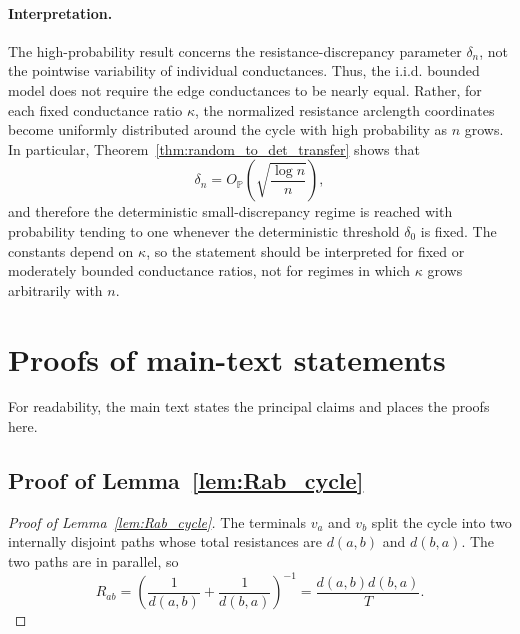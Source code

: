 \documentclass[11pt]{article}
\numberwithin{equation}{section}
\theoremstyle{definition}
\theoremstyle{remark}
\begin{document}
\paragraph{Interpretation.}
The high-probability result concerns the resistance-discrepancy parameter
$\delta_n$, not the pointwise variability of individual conductances. Thus,
the i.i.d. bounded model does not require the edge conductances to be nearly
equal. Rather, for each fixed conductance ratio $\kappa$, the normalized
resistance arclength coordinates become uniformly distributed around the
cycle with high probability as $n$ grows. In particular,
Theorem~\ref{thm:random_to_det_transfer} shows that
\[
\delta_n = O_{\mathbb P}\!\left(\sqrt{\frac{\log n}{n}}\right),
\]
and therefore the deterministic small-discrepancy regime is reached with
probability tending to one whenever the deterministic threshold
$\delta_0$ is fixed. The constants depend on $\kappa$, so the statement
should be interpreted for fixed or moderately bounded conductance ratios,
not for regimes in which $\kappa$ grows arbitrarily with $n$.




\section{Proofs of main-text statements}
\label{app:main-proofs}
For readability, the main text states the principal claims and places the proofs here.

\subsection{Proof of Lemma~\ref{lem:Rab_cycle}}
\begin{proof}[Proof of Lemma~\ref{lem:Rab_cycle}]
	The terminals $v_a$ and $v_b$ split the cycle into two internally disjoint paths whose total resistances are $d(a,b)$ and $d(b,a)$.
	The two paths are in parallel, so
	\[
	R_{ab}=\left(\frac1{d(a,b)}+\frac1{d(b,a)}\right)^{-1}
	=\frac{d(a,b)d(b,a)}{T}.
	\]
\end{proof}
\end{document}
